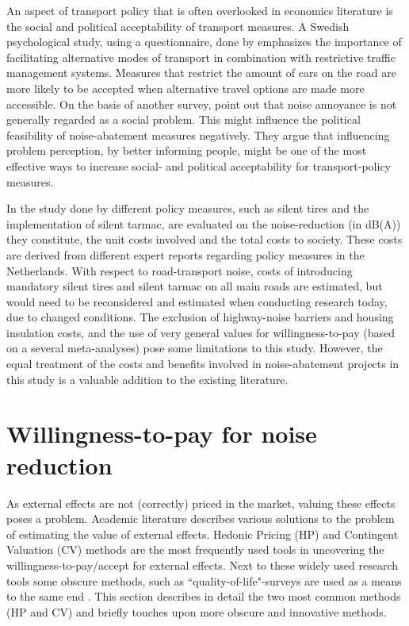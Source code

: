 \documentclass[a4paper]{scrartcl}
\begin{document}
An aspect of transport policy that is often overlooked in economics literature is the social and political acceptability of transport measures. A Swedish psychological study, using a questionnaire, done by \cite{Eriksson2008} emphasizes the importance of facilitating alternative modes of transport in combination with restrictive traffic management systems. Measures that restrict the amount of cars on the road are more likely to be accepted when alternative travel options are made more accessible. On the basis of another survey, \cite{Rienstra1999} point out that noise annoyance is not generally regarded as a social problem. This might influence the political feasibility of noise-abatement measures negatively. They argue that influencing problem perception, by better informing people, might be one of the most effective ways to increase social- and political acceptability for transport-policy measures.
	
In the study done by \cite{Nijland2003} different policy measures, such as silent tires and the implementation of silent tarmac, are evaluated on the noise-reduction (in dB(A)) they constitute, the unit costs involved and the total costs to society. These costs are derived from different expert reports regarding policy measures in the Netherlands. With respect to road-transport noise, costs of introducing mandatory silent tires and silent tarmac on all main roads are estimated, but would need to be reconsidered and estimated when conducting research today, due to changed conditions.  The exclusion of highway-noise barriers and housing insulation costs, and the use of very general values for willingness-to-pay (based on a several meta-analyses) pose some limitations to this study. However, the equal treatment of the costs and benefits involved in noise-abatement projects in this study is a valuable addition to the existing literature.

\section{Willingness-to-pay for noise reduction}

As external effects are not (correctly) priced in the market, valuing these effects poses a problem. Academic literature describes various solutions to the problem of estimating the value of external effects. Hedonic Pricing (HP) and Contingent Valuation (CV) methods are the most frequently used tools in uncovering the willingness-to-pay/accept for external effects. Next to these widely used research tools some obscure methods, such as ``quality-of-life"-surveys are used as a means to the same end \citep{VanPraag2005}. This section describes in detail the two most common methods (HP and CV) and briefly touches upon more obscure and innovative methods.
\end{document}

